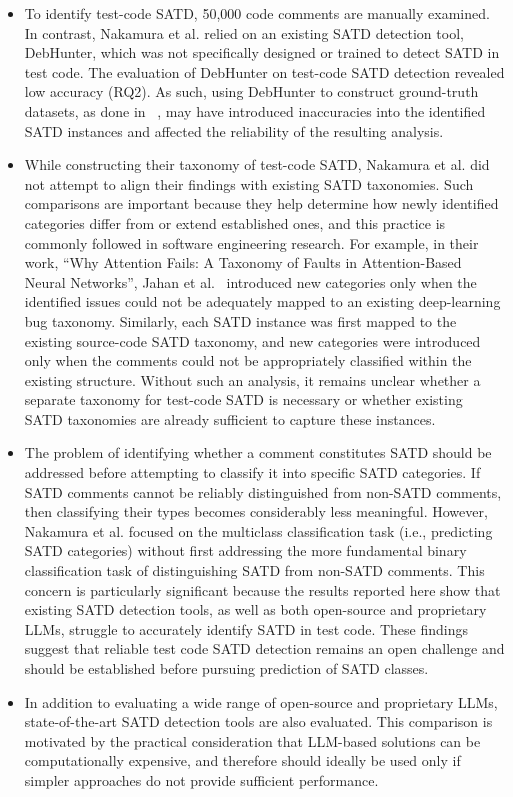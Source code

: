 \begin{itemize}
     \item To identify test-code SATD, 50,000 code comments are manually examined. In contrast, Nakamura et al. relied on an existing SATD detection tool, DebHunter, which was not specifically designed or trained to detect SATD in test code. The evaluation of DebHunter on test-code SATD detection revealed low accuracy (RQ2). As such, using DebHunter to construct ground-truth datasets, as done in ~\cite{nakamura2025understanding}, may have introduced inaccuracies into the identified SATD instances and affected the reliability of the resulting analysis.
     \item While constructing their taxonomy of test-code SATD, Nakamura et al. did not attempt to align their findings with existing SATD taxonomies. Such comparisons are important because they help determine how newly identified categories differ from or extend established ones, and this practice is commonly followed in software engineering research. For example, in their work, ``Why Attention Fails: A Taxonomy of Faults in Attention-Based Neural Networks'', Jahan et al.~\cite{jahan2025attention} introduced new categories only when the identified issues could not be adequately mapped to an existing deep-learning bug taxonomy. Similarly, each SATD instance was first mapped to the existing source-code SATD taxonomy, and new categories were introduced only when the comments could not be appropriately classified within the existing structure. Without such an analysis, it remains unclear whether a separate taxonomy for test-code SATD is necessary or whether existing SATD taxonomies are already sufficient to capture these instances.
    \item The problem of identifying whether a comment constitutes SATD should be addressed before attempting to classify it into specific SATD categories. If SATD comments cannot be reliably distinguished from non-SATD comments, then classifying their types becomes considerably less meaningful. However, Nakamura et al. focused on the multiclass classification task (i.e., predicting SATD categories) without first addressing the more fundamental binary classification task of distinguishing SATD from non-SATD comments. This concern is particularly significant because the results reported here show that existing SATD detection tools, as well as both open-source and proprietary LLMs, struggle to accurately identify SATD in test code. These findings suggest that reliable test code SATD detection remains an open challenge and should be established before pursuing prediction of SATD classes.
    \item In addition to evaluating a wide range of open-source and proprietary LLMs, state-of-the-art SATD detection tools are also evaluated. This comparison is motivated by the practical consideration that LLM-based solutions can be computationally expensive, and therefore should ideally be used only if simpler approaches do not provide sufficient performance.


\end{itemize}

